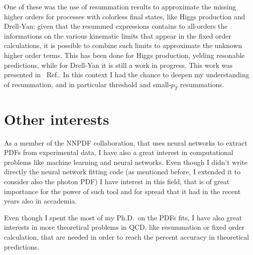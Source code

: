 \documentclass[11pt,a4paper]{moderncv}        %
\begin{document}
One of these was the use of resummation results to approximate the missing higher orders for processes with colorless final states,
like Higgs production and Drell-Yan:
given that the resummed expressions
contains to all-orders the informations on the various kinematic limits that appear in the fixed order calculations, it is possible
to combine such limits to approximate the unknown higher order terms.
This has been done for Higgs production, yelding resonable predictions, while for Drell-Yan it is still a work in progress.
This work was presented in~ Ref.\cite{laurenti2022approximating}.
In this context I had the chance to deepen my understanding of resummation, and in particular threshold and small-$p_T$ resummations.

\section{Other interests}

As a member of the NNPDF collaboration, that uses neural networks to extract PDFs from experimental data, I have also a great interest
in computational problems like machine learning and neural networks.
Even though I didn't write directly the neural network fitting code (as mentioned before, I extended it to consider also the photon PDF)
I have interest in this field, that is of great importance for the power of such tool and for spread that it had in the recent years
also in accademia.

Even though I spent the most of my Ph.D.\ on the PDFs fits, I have also great interests in more theoretical problems in QCD,
like resummation or fixed order calculation, that are needed in order to reach the percent accuracy in theoretical predictions.



\end{document}
